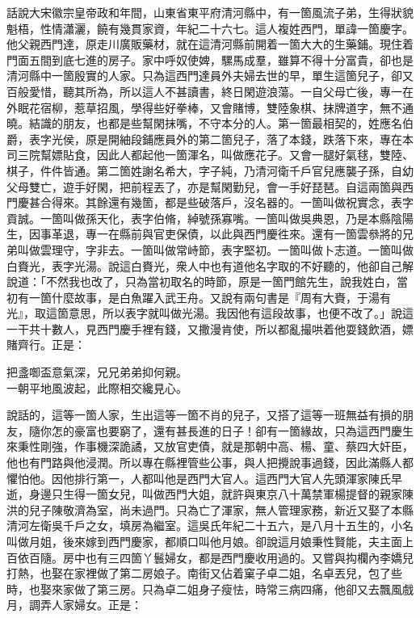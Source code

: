 話說大宋徽宗皇帝政和年間，山東省東平府清河縣中，有一箇風流子弟，生得狀貌魁梧，性情瀟灑，饒有幾貫家資，年紀二十六七。這人複姓西門，單諱一箇慶字。他父親西門達，原走川廣販藥材，就在這清河縣前開着一箇大大的生藥鋪。現住着門面五間到底七進的房子。家中呼奴使婢，騾馬成羣，雖算不得十分富貴，卻也是清河縣中一箇殷實的人家。只為這西門達員外夫婦去世的早，單生這箇兒子，卻又百般愛惜，聽其所為，所以這人不甚讀書，{}終日閑遊浪蕩。一自父母亡後，專一在外眠花宿柳，惹草招風，學得些好拳棒，又會賭博，雙陸象棋、抹牌道字，無不通曉。結識的朋友，也都是些幫閑抹嘴，不守本分的人。第一箇最相契的，姓應名伯爵，表字光侯，原是開紬段鋪應員外的第二箇兒子，落了本錢，跌落下來，專在本司三院幫嫖貼食，因此人都起他一箇渾名，叫做應花子。又會一腿好氣毬，雙陸、棋子，件件皆通。{}第二箇姓謝名希大，字子純，乃清河衛千戶官兒應襲子孫，自幼父母雙亡，遊手好閑，把前程丟了，亦是幫閑勤兒，會一手好琵琶。自這兩箇與西門慶甚合得來。其餘還有幾箇，都是些破落戶，沒名器的。一箇叫做祝實念，表字貢誠。一箇叫做孫天化，表字伯脩，綽號孫寡嘴。一箇叫做吳典恩，乃是本縣陰陽生，因事革退，專一在縣前與官吏保債，以此與西門慶徃來。還有一箇雲叅將的兄弟叫做雲理守，字非去。一箇叫做常峙節，表字堅初。一箇叫做卜志道。一箇叫做白賚光，表字光湯。說這白賚光，衆人中也有道他名字取的不好聽的，他卻自己解說道：「不然我也改了，只為當初取名的時節，原是一箇門館先生，說我姓白，當初有一箇什麼故事，是白魚躍入武王舟。又說有兩句書是『周有大賚，于湯有光』，取這箇意思，所以表字就叫做光湯。我因他有這段故事，也便不改了。」{}說這一干共十數人，見西門慶手裡有錢，又撒漫肯使，所以都亂撮哄着他耍錢飲酒，嫖賭齊行。正是：

\begin{myquote}
把盞啣盃意氣深，兄兄弟弟抑何親。\\
一朝平地風波起，此際相交纔見心。
\end{myquote}

說話的，這等一箇人家，生出這等一箇不肖的兒子，又搭了這等一班無益有損的朋友，隨你怎的豪富也要窮了，還有甚長進的日子！卻有一箇緣故，只為這西門慶生來秉性剛強，作事機深詭譎，又放官吏債，就是那朝中高、楊、童、蔡四大奸臣，他也有門路與他浸潤。{}所以專在縣裡管些公事，與人把攪說事過錢，因此滿縣人都懼怕他。因他排行第一，人都叫他是西門大官人。這西門大官人先頭渾家陳氏早逝，身邊只生得一箇女兒，叫做西門大姐，就許與東京八十萬禁軍楊提督的親家陳洪的兒子陳敬濟為室，尚未過門。只為亡了渾家，無人管理家務，新近又娶了本縣清河左衛吳千戶之女，填房為繼室。這吳氏年紀二十五六，是八月十五生的，小名叫做月姐，後來嫁到西門慶家，都順口叫他月娘。卻說這月娘秉性賢能，夫主面上百依百隨。{}房中也有三四箇丫鬟婦女，都是西門慶收用過的。又嘗與抅欄內李嬌兒打熱，也娶在家裡做了第二房娘子。南街又佔着窠子卓二姐，名卓丟兒，包了些時，也娶來家做了第三房。只為卓二姐身子瘦怯，時常三病四痛，他卻又去飄風戲月，調弄人家婦女。正是：

